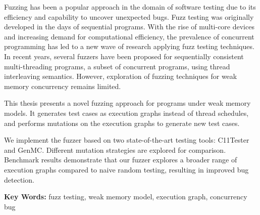 
Fuzzing has been a popular approach in the domain of software testing due to its efficiency and capability to uncover  unexpected bugs. Fuzz testing was originally developed in the days of sequential programs. With the rise of multi-core devices and increasing demand for computational efficiency, the prevalence of concurrent programming has led to a new wave of research applying fuzz testing techniques. In recent years, several fuzzers have been proposed for sequentially consistent multi-threading programs, a subset of concurrent programs, using thread interleaving semantics. However, exploration of fuzzing techniques for weak memory concurrency remains limited.

This thesis presents a novel fuzzing approach for programs under weak memory models. It generates test cases as execution graphs instead of thread schedules, and performs mutations on the execution graphs to generate new test cases.

We implement the fuzzer based on two state-of-the-art testing tools: C11Tester and GenMC. Different mutation strategies are explored for comparison. Benchmark results demonstrate that our fuzzer explores a broader range of execution graphs compared to naive random testing, resulting in improved bug detection.

\textbf{Key Words:} fuzz testing, weak memory model, execution graph, concurrency bug

